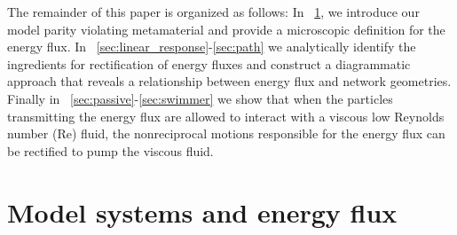 \documentclass[
 preprint,
 preprintnumbers,
 amsmath,amssymb,
 aps,
 pre,
 longbibliography,
 superscriptaddress,
 10pt, twocolumn
]{revtex4-1}
\begin{document}





The remainder of this paper is organized as follows:
In \secname~\ref{sec:model}, we introduce our model parity violating metamaterial and provide a microscopic definition for the energy flux.
In \secname~\ref{sec:linear_response}-\ref{sec:path} we analytically identify the ingredients for rectification of energy fluxes and construct a diagrammatic approach that reveals a relationship between energy flux and network geometries.
Finally in \secname~\ref{sec:passive}-\ref{sec:swimmer} we show that when the particles transmitting the energy flux are allowed to interact with a viscous low Reynolds number (Re) fluid, the nonreciprocal motions responsible for the energy flux can be rectified to pump the viscous fluid. 

\section{Model systems and energy flux} \label{sec:model}
\end{document}
